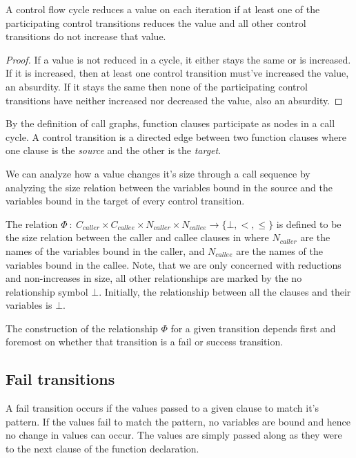 \begin{lemma}\label{lemma:cycle-reduce} A control flow cycle reduces a value on
each iteration if at least one of the participating control transitions reduces
the value and all other control transitions do not increase that
value.\end{lemma}

\begin{proof} If a value is not reduced in a cycle, it either stays the same or
is increased. If it is increased, then at least one control transition must've
increased the value, an absurdity. If it stays the same then none of the
participating control transitions have neither increased nor decreased the
value, also an absurdity. \end{proof}

By the definition of call graphs, function clauses participate as nodes in a
call cycle. A control transition is a directed edge between two function
clauses where one clause is the \emph{source} and the other is the
\emph{target}. 

We can analyze how a value changes it's size through a call sequence by
analyzing the size relation between the variables bound in the source and the
variables bound in the target of every control transition.

\begin{definition} The relation $\Phi\ :\ C_{caller} \times C_{callee} \times
N_{caller} \times N_{callee} \rightarrow \{\bot,<,\leq\}$ is defined to be the
size relation between the caller and callee
clauses in \D{} where $N_{caller}$ are the names of the variables bound in the
caller, and $N_{callee}$ are the names of the variables bound in the callee.
Note, that we are only concerned with reductions and non-increases in size, all
other relationships are marked by the no relationship symbol $\bot$. Initially,
the relationship between all the clauses and their variables is $\bot$.
\end{definition}

The construction of the relationship $\Phi$ for a given transition depends
first and foremost on whether that transition is a fail or success transition.

\subsection{Fail transitions}

A fail transition occurs if the values passed to a given clause to match it's
pattern. If the values fail to match the pattern, no variables are bound and
hence no change in values can occur. The values are simply passed along as they
were to the next clause of the function declaration.

